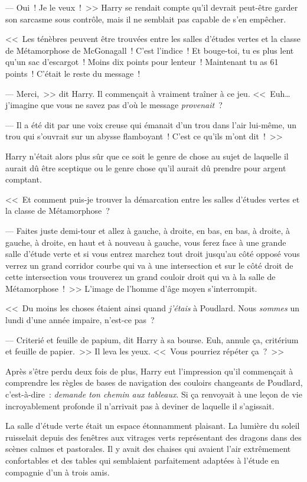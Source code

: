--- Oui~! Je le veux~!~>> Harry se rendait compte qu'il devrait peut-être garder son sarcasme sous contrôle, mais il ne semblait pas capable de s'en empêcher.

<<~Les ténèbres peuvent être trouvées entre les salles d'études vertes et la classe de Métamorphose de McGonagall~! C'est l'indice~! Et bouge-toi, tu es plus lent qu'un sac d'escargot~! Moins dix points pour lenteur~! Maintenant tu as 61 points~! C'était le reste du message~!

--- Merci,~>> dit Harry. Il commençait à vraiment traîner à ce jeu. <<~Euh… j'imagine que vous ne savez pas d'où le message \emph{provenait}~?

--- Il a été dit par une voix creuse qui émanait d'un trou dans l'air lui-même, un trou qui s'ouvrait sur un abysse flamboyant~! C'est ce qu'ils m'ont dit~!~>>

Harry n'était alors plus sûr que ce soit le genre de chose au sujet de laquelle il aurait dû être sceptique ou le genre chose qu'il aurait dû prendre pour argent comptant.

<<~Et comment puis-je trouver la démarcation entre les salles d'études vertes et la classe de Métamorphose~?

--- Faites juste demi-tour et allez à gauche, à droite, en bas, en bas, à droite, à gauche, à droite, en haut et à nouveau à gauche, vous ferez face à une grande salle d'étude verte et si vous entrez marchez tout droit jusqu'au côté opposé vous verrez un grand corridor courbe qui va à une intersection et sur le côté droit de cette intersection vous trouverez un grand couloir droit qui va à la salle de Métamorphose~!~>> L'image de l'homme d'âge moyen s'interrompit.

<<~Du moins les choses étaient ainsi quand \emph{j'étais} à Poudlard. Nous \emph{sommes} un lundi d'une année impaire, n'est-ce pas~?

--- Criterié et feuille de papium, dit Harry à sa bourse. Euh, annule ça, critérium et feuille de papier.~>> Il leva les yeux. <<~Vous pourriez répéter ça~?~>>

Après s'être perdu deux fois de plus, Harry eut l'impression qu'il commençait à comprendre les règles de bases de navigation des couloirs changeants de Poudlard, c'est-à-dire~: \emph{demande ton chemin aux tableaux}. Si ça renvoyait à une leçon de vie incroyablement profonde il n'arrivait pas à deviner de laquelle il s'agissait.

La salle d'étude verte était un espace étonnamment plaisant. La lumière du soleil ruisselait depuis des fenêtres aux vitrages verts représentant des dragons dans des scènes calmes et pastorales. Il y avait des chaises qui avaient l'air extrêmement confortables et des tables qui semblaient parfaitement adaptées à l'étude en compagnie d'un à trois amis.

